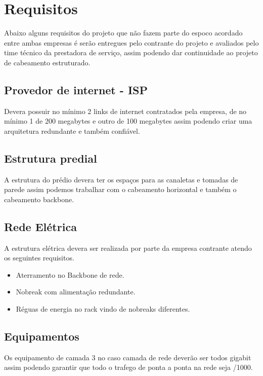 \documentclass[	DIV=calc,%
							paper=a4,%
							fontsize=12pt,%
							onecolumn]{scrartcl}	 					%
\begin{document}




\section{Requisitos}
Abaixo alguns requisitos do projeto que não fazem parte do espoco acordado entre ambas empresas é serão entregues pelo contrante do projeto e avaliados pelo time técnico da prestadora de serviço, assim podendo dar continuidade ao projeto de cabeamento estruturado.

\subsection{Provedor de internet - ISP}
Devera possuir no mínimo 2 links de internet contratados pela empresa, de no mínimo 1 de 200 megabytes e outro de 100 megabytes assim podendo criar uma arquitetura redundante e também confiável.  

\subsection{Estrutura predial}
A estrutura do prédio devera ter os espaços para as canaletas e tomadas de parede assim podemos trabalhar com o cabeamento horizontal e também o cabeamento backbone.  

\subsection{Rede Elétrica}
A estrutura elétrica devera ser realizada por parte da empresa contrante atendo os seguintes requisitos.
\begin{itemize}
	\item Aterramento no Backbone de rede.
	\item Nobreak com alimentação redundante.
	\item Réguas de energia no rack vindo de nobreaks diferentes.  
\end{itemize}
  	 
\subsection{Equipamentos}
Os equipamento de camada 3 no caso camada de rede deverão ser todos gigabit assim podendo garantir que todo o trafego de ponta a ponta na rede seja /1000. 
\end{document}

